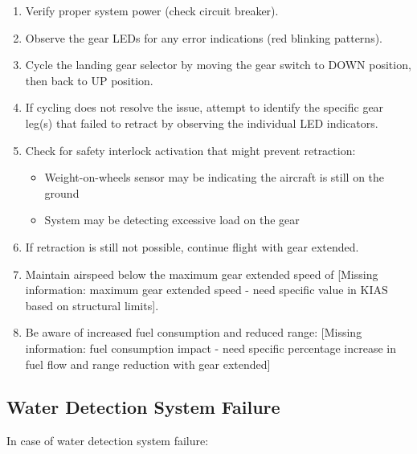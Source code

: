 \documentclass[12pt,a4paper,twoside,openright]{book}
\begin{document}
\begin{enumerate}
    \item Verify proper system power (check circuit breaker).
    \item Observe the gear LEDs for any error indications (red blinking patterns).
    \item Cycle the landing gear selector by moving the gear switch to DOWN position, then back to UP position.
    \item If cycling does not resolve the issue, attempt to identify the specific gear leg(s) that failed to retract by observing the individual LED indicators.
    \item Check for safety interlock activation that might prevent retraction:
    \begin{itemize}
        \item Weight-on-wheels sensor may be indicating the aircraft is still on the ground
        \item System may be detecting excessive load on the gear
    \end{itemize}
    \item If retraction is still not possible, continue flight with gear extended.
    \item Maintain airspeed below the maximum gear extended speed of {\color{red}[Missing information: maximum gear extended speed - need specific value in KIAS based on structural limits]}.
    \item Be aware of increased fuel consumption and reduced range: {\color{red}[Missing information: fuel consumption impact - need specific percentage increase in fuel flow and range reduction with gear extended]}
\end{enumerate}

\subsection{Water Detection System Failure}

In case of water detection system failure:
\end{document}
